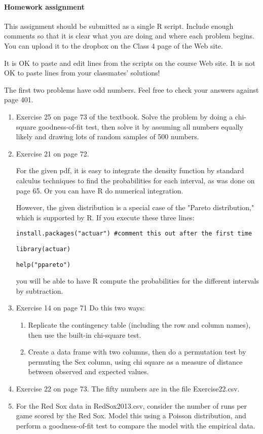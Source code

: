 \documentclass[12pt]{article}
\begin{document}
\pagebreak


\paragraph*{Homework assignment}

This assignment should be submitted as a single R script. Include enough comments so that it is clear what you are doing and where each problem begins. You can upload it to the dropbox on the Class 4 page of the Web site. 

It is OK to paste and edit lines from the scripts on the course Web site. It is not OK to paste lines from your classmates' solutions!

The first two problems have odd numbers. Feel free to check your answers against page 401.

\begin{enumerate}
\item Exercise 25 on page 73 of the textbook. Solve the problem by doing a chi-square goodness-of-fit test, then solve it by assuming all numbers equally likely and drawing lots of random samples of 500 numbers.

\item Exercise 21 on page 72. 

For the given pdf, it is easy to integrate the density function by standard calculus techniques to find the probabilities for each interval, as was done on page 65. Or you can have R do numerical integration.

 However, the given distribution is a special case of the "Pareto distribution," which is supported by R. If you execute these three lines:

\verb!install.packages("actuar") #comment this out after the first time!

\verb!library(actuar)! 

\verb!help("ppareto")!

you will be able to have R compute the probabilities for the different intervals by subtraction.

\item Exercise 14 on page 71 Do this two ways:

\begin{enumerate}
\item Replicate the contingency table (including the row and column names), then use the built-in chi-square test. 
\item Create a data frame with two columns, then do a permutation test by permuting the Sex column, using chi square as a measure of distance between observed and expected values.
\end{enumerate}

\item Exercise 22 on page 73. The fifty numbers are in the file Exercise22.csv.

\item For the Red Sox data in RedSox2013.csv, consider the number of runs per game scored by the Red Sox. Model this using a Poisson distribution, and perform a goodness-of-fit test to compare the model with the empirical data.

\end{enumerate}









\pagebreak
\end{document}
